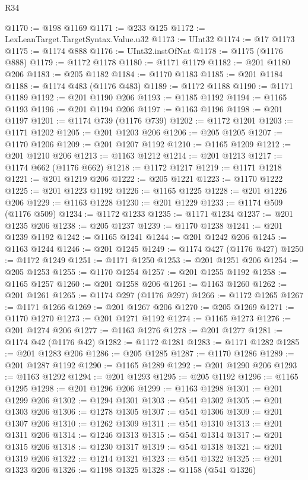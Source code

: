 \begin{lexlean}{R34}
\begin{coremodule}
@1170 := @198 @1169
@1171 := @233 @125
@1172 := LexLeanTarget.TargetSyntax.Value.u32
@1173 := UInt32
@1174 := @17 @1173
@1175 := @1174 @888
@1176 := UInt32.instOfNat
@1178 := @1175 (@1176 @888)
@1179 := @1172 @1178
@1180 := @1171 @1179
@1182 := @201 @1180 @206
@1183 := @205 @1182
@1184 := @1170 @1183
@1185 := @201 @1184
@1188 := @1174 @483 (@1176 @483)
@1189 := @1172 @1188
@1190 := @1171 @1189
@1192 := @201 @1190 @206
@1193 := @1185 @1192
@1194 := @1165 @1193
@1196 := @201 @1194 @206
@1197 := @1163 @1196
@1198 := @201 @1197
@1201 := @1174 @739 (@1176 @739)
@1202 := @1172 @1201
@1203 := @1171 @1202
@1205 := @201 @1203 @206
@1206 := @205 @1205
@1207 := @1170 @1206
@1209 := @201 @1207 @1192
@1210 := @1165 @1209
@1212 := @201 @1210 @206
@1213 := @1163 @1212
@1214 := @201 @1213
@1217 := @1174 @662 (@1176 @662)
@1218 := @1172 @1217
@1219 := @1171 @1218
@1221 := @201 @1219 @206
@1222 := @205 @1221
@1223 := @1170 @1222
@1225 := @201 @1223 @1192
@1226 := @1165 @1225
@1228 := @201 @1226 @206
@1229 := @1163 @1228
@1230 := @201 @1229
@1233 := @1174 @509 (@1176 @509)
@1234 := @1172 @1233
@1235 := @1171 @1234
@1237 := @201 @1235 @206
@1238 := @205 @1237
@1239 := @1170 @1238
@1241 := @201 @1239 @1192
@1242 := @1165 @1241
@1244 := @201 @1242 @206
@1245 := @1163 @1244
@1246 := @201 @1245
@1249 := @1174 @427 (@1176 @427)
@1250 := @1172 @1249
@1251 := @1171 @1250
@1253 := @201 @1251 @206
@1254 := @205 @1253
@1255 := @1170 @1254
@1257 := @201 @1255 @1192
@1258 := @1165 @1257
@1260 := @201 @1258 @206
@1261 := @1163 @1260
@1262 := @201 @1261
@1265 := @1174 @297 (@1176 @297)
@1266 := @1172 @1265
@1267 := @1171 @1266
@1269 := @201 @1267 @206
@1270 := @205 @1269
@1271 := @1170 @1270
@1273 := @201 @1271 @1192
@1274 := @1165 @1273
@1276 := @201 @1274 @206
@1277 := @1163 @1276
@1278 := @201 @1277
@1281 := @1174 @42 (@1176 @42)
@1282 := @1172 @1281
@1283 := @1171 @1282
@1285 := @201 @1283 @206
@1286 := @205 @1285
@1287 := @1170 @1286
@1289 := @201 @1287 @1192
@1290 := @1165 @1289
@1292 := @201 @1290 @206
@1293 := @1163 @1292
@1294 := @201 @1293
@1295 := @205 @1192
@1296 := @1165 @1295
@1298 := @201 @1296 @206
@1299 := @1163 @1298
@1301 := @201 @1299 @206
@1302 := @1294 @1301
@1303 := @541 @1302
@1305 := @201 @1303 @206
@1306 := @1278 @1305
@1307 := @541 @1306
@1309 := @201 @1307 @206
@1310 := @1262 @1309
@1311 := @541 @1310
@1313 := @201 @1311 @206
@1314 := @1246 @1313
@1315 := @541 @1314
@1317 := @201 @1315 @206
@1318 := @1230 @1317
@1319 := @541 @1318
@1321 := @201 @1319 @206
@1322 := @1214 @1321
@1323 := @541 @1322
@1325 := @201 @1323 @206
@1326 := @1198 @1325
@1328 := @1158 (@541 @1326)

\end{coremodule}
\end{lexlean}
